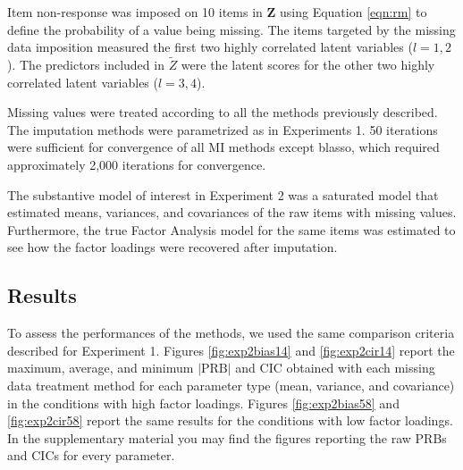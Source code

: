 
	Item non-response was imposed on 10 items in $\bm{Z}$ using Equation \ref{eqn:rm} to define the probability
	of a value being missing.
	The items targeted by the missing data imposition measured the first two highly correlated latent variables
	($l = 1, 2$).
	The predictors included in $\tilde{Z}$ were the latent scores for the other two highly correlated latent 
	variables ($l = 3, 4$).
	
	
	Missing values were treated according to all the methods previously described.
	The imputation methods were parametrized as in Experiments 1.
	50 iterations were sufficient for convergence of all MI methods except blasso, which required approximately 
	2,000 iterations for convergence.

	
	The substantive model of interest in Experiment 2 was a saturated model that estimated means,
	variances, and covariances of the raw items with missing values.
	Furthermore, the true Factor Analysis model for the same items was estimated to see how the 
	factor loadings were recovered after imputation.

\subsection{Results}
	To assess the performances of the methods, we used the same comparison criteria described for Experiment 1.
	Figures \ref{fig:exp2bias14} and \ref{fig:exp2cir14} report the maximum, average, and minimum $|\text{PRB}|$ and 
	CIC obtained with each missing data treatment method for each parameter type (mean, variance, and covariance) in 
	the conditions with high factor loadings.
	Figures \ref{fig:exp2bias58} and \ref{fig:exp2cir58} report the same results for the conditions with low 
	factor loadings.
	In the supplementary material you may find the figures reporting the raw PRBs and CICs for every parameter.

